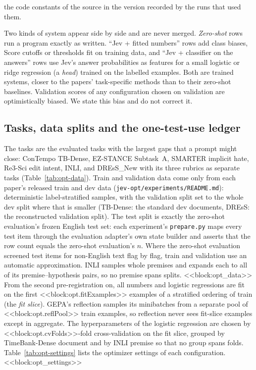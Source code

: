 the code constants of the \jevopt{} source in the version recorded by the runs that used them.

Two kinds of system appear side by side and are never merged. \emph{Zero-shot} rows run a program exactly as written. ``Jev + fitted numbers'' rows add class biases, Score cutoffs or thresholds fit on training data, and ``Jev + classifier on the answers'' rows use Jev's answer probabilities as features for a small logistic or ridge regression (a \emph{head}) trained on the labelled examples. Both are trained systems, closer to the papers' task-specific methods than to their zero-shot baselines. Validation scores of any configuration chosen on validation are optimistically biased. We state this bias and do not correct it.

\subsection{Tasks, data splits and the one-test-use ledger}\label{app:opt-data}
The tasks are the evaluated tasks with the largest gaps that a prompt might close: ConTempo TB-Dense, EZ-STANCE Subtask~A, SMARTER implicit hate, Re3-Sci edit intent, INLI, and DREsS\_New with its three rubrics as separate tasks (Table~\ref{tab:opt-data}). Train and validation data come only from each paper's released train and dev data (\texttt{jev-opt/\allowbreak experiments/\allowbreak README.md}): deterministic label-stratified samples, with the validation split set to the whole dev split where that is smaller (TB-Dense: the standard dev documents, DREsS: the reconstructed validation split). The test split is exactly the zero-shot evaluation's frozen English test set: each experiment's \texttt{prepare.py} maps every test item through the evaluation adapter's own state builder and asserts that the row count equals the zero-shot evaluation's $n$. Where the zero-shot evaluation screened test items for non-English text flag by flag, train and validation use an automatic approximation. INLI samples whole premises and expands each to all of its premise--hypothesis pairs, so no premise spans splits.
<<block:opt_data>>
From the second pre-registration on, all numbers and logistic regressions are fit on the first <<block:opt.fitExamples>> examples of a stratified ordering of train (the \emph{fit slice}). GEPA's reflection samples its minibatches from a separate pool of <<block:opt.reflPool>> train examples, so reflection never sees fit-slice examples except in aggregate. The hyperparameters of the logistic regression are chosen by <<block:opt.cvFolds>>-fold cross-validation on the fit slice, grouped by TimeBank-Dense document and by INLI premise so that no group spans folds. Table~\ref{tab:opt-settings} lists the optimizer settings of each configuration.
<<block:opt_settings>>


